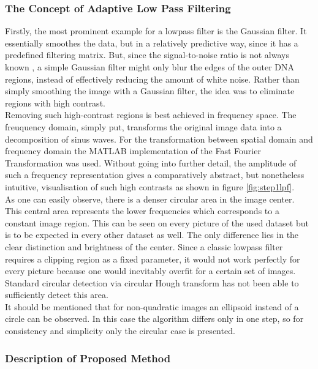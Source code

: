 \documentclass{article}
\begin{document}
\subsubsection{The Concept of Adaptive Low Pass Filtering}
Firstly, the most prominent example for a lowpass filter is the Gaussian filter. It essentially smoothes the data, but in a relatively predictive way, since it has a predefined filtering matrix. But, since the signal-to-noise ratio is not always known , a simple Gaussian filter might only blur the edges of the outer DNA regions, instead of effectively reducing the amount of white noise. Rather than simply smoothing the image with a Gaussian filter, the idea was to eliminate regions with high contrast.  \\
Removing such high-contrast regions is best achieved in frequency space. The freuquency domain, simply put, transforms the original image data into a decomposition of sinus waves. For the transformation between spatial domain and frequency domain the MATLAB implementation of the Fast Fourier Transformation was used. Without going into further detail, the amplitude of such a frequency representation gives a comparatively abstract, but nonetheless intuitive, visualisation of such high contrasts as shown in figure \ref{fig:step1lpf}. \\
As one can easily observe, there is a denser circular area in the image center. This central area represents the lower frequencies which corresponds to a constant image region. This can be seen on every picture of the used dataset but is to be expected in every other dataset as well. The only difference lies in the clear distinction and brightness of the center. Since a classic lowpass filter requires a clipping region as a fixed parameter, it would not work perfectly for every picture because one would inevitably overfit for a certain set of images. Standard circular detection via circular Hough transform has not been able to sufficiently detect this area. \\
It should be mentioned that for non-quadratic images an ellipsoid instead of a circle can be observed. In this case the algorithm differs only in one step, so for consistency and simplicity only the circular case is presented. \\

\subsubsection{Description of Proposed Method}
\end{document}
